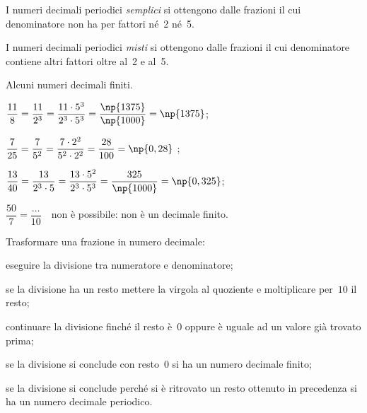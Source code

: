 I numeri decimali periodici \emph{semplici} si ottengono dalle frazioni il cui denominatore non ha per fattori né~2 né~5.

I numeri decimali periodici \emph{misti} si ottengono dalle frazioni il cui denominatore contiene altri fattori oltre al~2
e al~5.

\begin{exrig}
 \begin{esempio}
 Alcuni numeri decimali finiti.
\begin{enumeratea}
 \item $\dfrac{11}{8}=\dfrac{11}{2^3}=
\dfrac{11\cdot 5^3}{2^3\cdot 5^3}=\dfrac{\np{1375}}{\np{1000}}=\np{1375}$;
 \item $\dfrac{7}{25}=\dfrac{7}{5^2}=
\dfrac{7\cdot 2^2}{5^2\cdot 2^2}=\dfrac{28}{100}=\np{0,28}~$;
 \item $\dfrac{13}{40}=\dfrac{13}{2^3\cdot 5}=
\dfrac{13\cdot 5^2}{2^3\cdot 5^3}=\dfrac{325}{\np{1000}}=\np{0,325}$;
 \item $\dfrac{50}{7} = \dfrac{\ldots}{10}$~~non è possibile: non è un decimale finito.
\end{enumeratea}
 \end{esempio}
\end{exrig}

\ovalbox{\risolvi \ref{ese:3.23}}

\begin{procedura}
Trasformare una frazione in numero decimale:
\begin{enumeratea}
 \item eseguire la divisione tra numeratore e denominatore;
 \item se la divisione ha un resto mettere la virgola al quoziente e moltiplicare per~$10$ il resto;
 \item continuare la divisione finché il resto è~$0$ oppure è uguale ad un valore già trovato prima;
 \item se la divisione si conclude con resto~$0$ si ha un numero decimale finito;
 \item se la divisione si conclude perché si è ritrovato un resto ottenuto in precedenza si ha un
numero decimale periodico.
\end{enumeratea}
\end{procedura}

